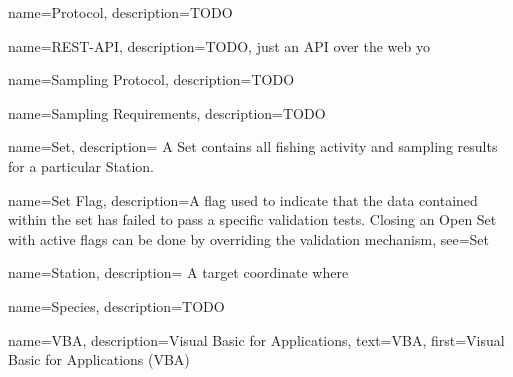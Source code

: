 {
  name=Protocol,
  description={TODO}
}

 {
  name=REST-API,
  description={TODO, just an API over the web yo}
}

 {
  name=Sampling Protocol,
  description={TODO}
}

 {
  name=Sampling Requirements,
  description={TODO}
}
    
 {
  name=Set,
  description={
    A Set contains all fishing activity and sampling results for a particular \gls{Station}.
  }
}

 {
  name=Set Flag,
  description={A flag used to indicate that the data contained within the set has failed to pass a specific validation tests. 
  Closing an \gls{Open Set} with active flags can be done by overriding the validation mechanism},
  see=\gls{Set}
  }

 {
  name=Station,
  description={
    A target coordinate where
  }
}
  
 {
  name=Species,
  description={TODO}
}

 {
  name=VBA,
  description={Visual Basic for Applications},
  text={VBA},
  first={Visual Basic for Applications (VBA)}
}

\glsaddall
\glsaddallunused

